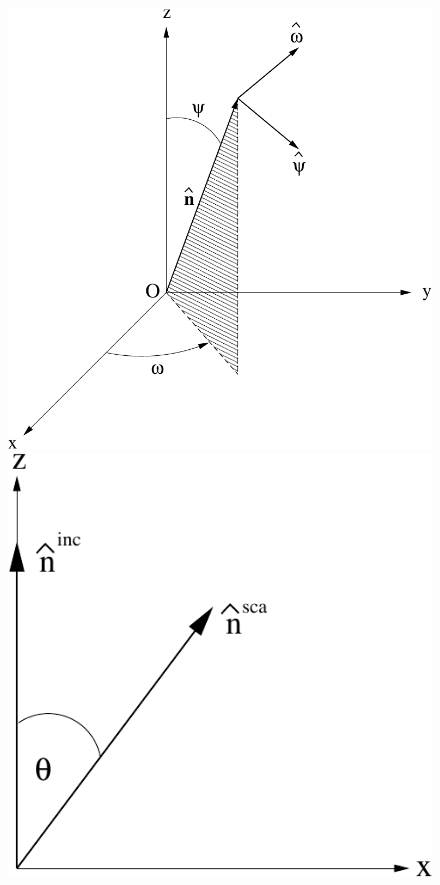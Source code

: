 \begin{figure}[t]
 \centering
 \begin{minipage}{.5\textwidth}
  \centering
   \includegraphics*[width=\textwidth]{coordinate_system}
 \end{minipage}%
 \hfill
 \begin{minipage}{.4\textwidth}
  \centering
   \includegraphics*[width=\textwidth]{part_frame}

\end{minipage}
\end{figure}
